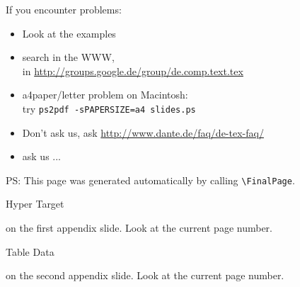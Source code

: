 \documentclass[11pt, a4paper, landscape]{article}
\begin{document}
\NewPage{} 
\begin{block}
  If you encounter problems:
  \begin{itemize}
  \item Look at the examples
  \item search in the WWW,\\ 
    \eg in \url{http://groups.google.de/group/de.comp.text.tex}
  \item a4paper/letter problem on Macintosh:\\ 
    try \texttt{ps2pdf -sPAPERSIZE=a4 slides.ps}
  \item Don't ask us, ask \url{http://www.dante.de/faq/de-tex-faq/}
  \item ask us ...
  \end{itemize}
\end{block}


\FinalPage
\vfill 
\centerline{\footnotesize PS: This page was generated automatically by calling
\texttt{\textbackslash FinalPage}.} 
\vfill

\NewPage
\centerline{}


\NewPage



\appendix
\NewPage{}
\vfill
\hypertarget{anchorname}{Hyper Target} on the first appendix slide. 
Look at the current page number.
\vfill

\NewPage{}
\vfill
\hypertarget{table_data}{Table Data} on the second appendix slide.
Look at the current page number.
\vfill
\end{document}
